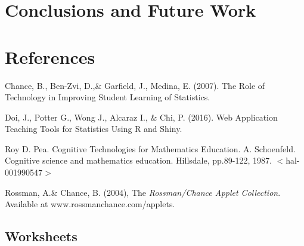 \documentclass[11pt]{book}
\begin{document}
\section{Conclusions and Future Work}
\section{References}


 \begin{thebibliography}{1}

  Chance, B., Ben-Zvi, D.,$\&$ Garfield, J.,  Medina, E. (2007). The Role of Technology in Improving Student Learning of Statistics.

  Doi, J., Potter G., Wong J., Alcaraz I., $\&$ Chi, P. (2016). Web Application Teaching Tools for Statistics Using R and Shiny. 

 Roy D. Pea. Cognitive Technologies for Mathematics Education. A. Schoenfeld. Cognitive science and mathematics education. Hillsdale, pp.89-122, 1987. $<$hal-001990547$>$

 Rossman, A.$\&$ Chance, B. (2004), The \emph{Rossman/Chance Applet Collection}. Available at www.rossmanchance.com/applets.


  \end{thebibliography}



\subsection{Worksheets}
\end{document}
